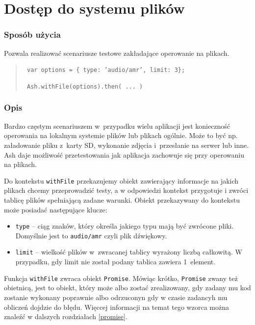 \documentclass[brudnopis]{xmgr}
\begin{document}
\section{Dostęp do systemu plików}

\subsubsection{Sposób użycia}
Pozwala realizować scenariusze testowe zakładające operowanie na plikach.

\begin{quote}
  \texttt{  var options = \{ type: 'audio/amr', limit: 3\};  }

  \texttt{  Ash.withFile(options).then( ... )  }
\end{quote}

\subsubsection{Opis}

Bardzo częstym scenariuszem w~przypadku wielu aplikacji jest konieczność operowania na lokalnym systemie plików lub plikach ogólnie. Może to być np. załadowanie pliku z~karty SD, wykonanie zdjęcia i~przesłanie na serwer lub inne. Ash daje możliwość przetestowania jak aplikacja zachowuje się przy operowaniu na plikach.  

Do kontekstu \texttt{withFile} przekazujemy obiekt zawierający informacje na jakich plikach chcemy przeprowadzić testy, a w odpowiedzi kontekst przygotuje i zwróci tablicę plików spełniającą zadane warunki. Obiekt przekazywany do kontekstu może posiadać następujące klucze:

\begin{itemize}
  \item \texttt{type} -- ciąg znaków, który określa jakiego typu mają być zwrócone pliki. Domyślnie jest to \texttt{audio/amr} czyli plik dźwiękowy. 
  \item \texttt{limit} -- wielkość plików w~zwracanej tablicy wyrażony liczbą całkowitą. W przypadku, gdy limit nie został podany tablica zawiera 1~element. 
\end{itemize}

Funkcja \texttt{withFile} zwraca obiekt \texttt{Promise}. Mówiąc krótko, \texttt{Promise} zwany też obietnicą, jest to obiekt, który może albo zostać zrealizowany, gdy zadany mu kod zostanie wykonany poprawnie albo odrzuconyn gdy w czasie zadancyh mu obliczeń dojdzie do błędu. Więccej informacji na temat tego wzorca można znaleźć w dalszych rozdziałach \ref{promise}.
\end{document}
